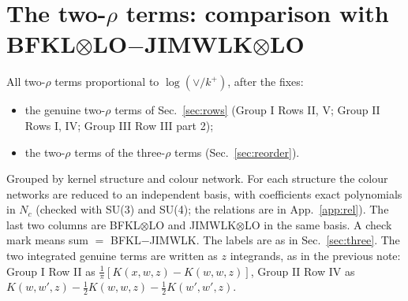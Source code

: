 \documentclass[10pt]{article}
\numberwithin{equation}{section}
\begin{document}
\section{The two-\texorpdfstring{$\rho$}{rho} terms: comparison with BFKL\texorpdfstring{$\otimes$}{x}LO\texorpdfstring{$-$}{-}JIMWLK\texorpdfstring{$\otimes$}{x}LO}\label{sec:two}
All two-$\rho$ terms proportional to $\log(\vee/k^+)$, after the fixes:
\begin{itemize}
\item the genuine two-$\rho$ terms of Sec.~\ref{sec:rows} (Group I Rows II, V; Group II Rows I, IV; Group III Row III part 2);
\item the two-$\rho$ terms of the three-$\rho$ terms (Sec.~\ref{sec:reorder}).
\end{itemize}
Grouped by kernel structure and colour network. For each structure the colour networks are reduced to an independent basis, with coefficients exact polynomials in $N_c$ (checked with SU(3) and SU(4); the relations are in App.~\ref{app:rel}). The last two columns are BFKL$\otimes$LO and JIMWLK$\otimes$LO in the same basis. A check mark means sum $=$ BFKL$-$JIMWLK. The labels are as in Sec.~\ref{sec:three}. The two integrated genuine terms are written as $z$ integrands, as in the previous note: Group I Row II as $\frac1\pi[K(x,w,z)-K(w,w,z)]$, Group II Row IV as $K(w,w',z)-\frac12K(w,w,z)-\frac12K(w',w',z)$.
\end{document}

